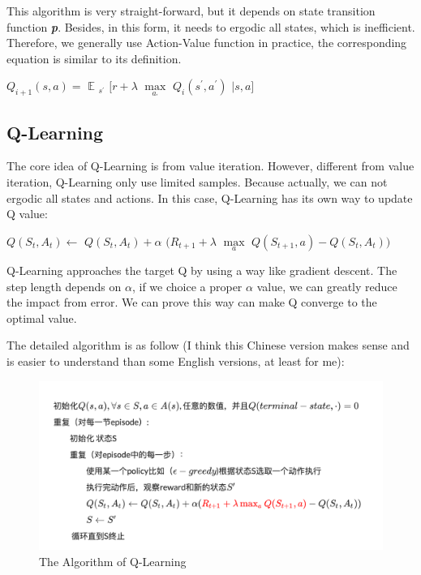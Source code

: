 \documentclass[10pt,twocolumn,letterpaper]{article}
\begin{document}
   This algorithm is very straight-forward, but it depends on state transition function \textbf{\textit{p}}. Besides, in this form, it needs to ergodic all states, which is inefficient. Therefore, we generally use Action-Value function in practice, the corresponding equation is similar to its definition.
   
 	\begin{center}
 		$Q_{i+1}(s,a)=$
 		$\mathbb{E}$
 		$_{s^{'}}$
 		$[r+\lambda$
 		$\max\limits_{a_{'}}$
 		$Q_{i}(s^{'},a^{'})$
 		$|s,a]$
 	\end{center}
	
	\subsection{Q-Learning}
	The core idea of Q-Learning is from value iteration. However, different from value iteration, Q-Learning only use limited samples. Because actually, we can not ergodic all states and actions. In this case, Q-Learning has its own way to update Q value:
	
	\begin{center}
		$Q(S_{t},A_{t})\leftarrow$
		$Q(S_{t},A_{t})+\alpha$
		$(R_{t+1}+\lambda$
		$\max\limits_{a}$
		$Q(S_{t+1},a)-Q(S_{t},A_{t}))$
	\end{center}
	
	Q-Learning approaches the target Q by using a way like gradient descent. The step length depends on $\alpha$, if we choice a proper $\alpha$ value, we can greatly reduce the impact from error. We can prove this way can make Q converge to the optimal value.
	
	The detailed algorithm is as follow (I think this Chinese version makes sense and is easier to understand than some English versions, at least for me):
	
	\begin{figure}[!htb]
    	\centering
    	\includegraphics[width = \linewidth]{images/Q_Learning}
    	\caption{The Algorithm of Q-Learning}
    	\label{fig::Q_Learning}
   \end{figure}
\end{document}
